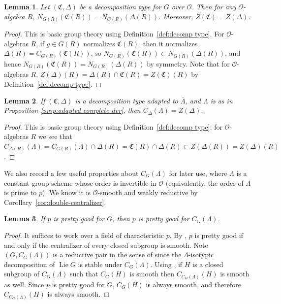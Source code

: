 \documentclass[11pt, letterpaper,english]{amsart}
\theoremstyle{plain}
\newtheorem{lem}{Lemma}
\newtheorem{lemma}[lem]{Lemma}
\theoremstyle{definition}
\numberwithin{equation}{section}
\numberwithin{lem}{section}
\newcommand{\fC}{\mathfrak{C}}
\newcommand{\cO}{\mathcal{O}}
\DeclareMathOperator{\Lie}{Lie}
\newcommand{\cent}[2]{C_{#1}(#2)}
\newcommand{\nlz}[2]{N_{#1}(#2)}
\newcommand{\Ld}{\Lambda}
\newcommand{\Lbar}{\overline{\Lambda}}
\newcommand{\Dt}{\Delta}
\begin{document}
\begin{lem} \label{lem:symmetry}
Let $(\fC, \Dt)$ be a decomposition type for $G$ over $\cO$. Then for any $\cO$-algebra $R$, $\nlz{G(R)}{\fC(R)}=\nlz{G(R)}{\Dt(R)}$.
Moreover, 
$Z(\fC)=Z(\Dt)$.
\end{lem}
\begin{proof}
This is basic group theory using Definition~\ref{def:decomp type}. For $\cO$-algebras $R$, if $g \in G(R)$ normalizes $\fC(R)$, then it normalizes $\Dt(R)=\cent{G(R)}{\fC(R)}$, so $\nlz{G(R)}{\fC(R)} \subset \nlz{G(R)}{\Dt(R)}$, and hence $\nlz{G(R)}{\fC(R)}=\nlz{G(R)}{\Dt(R)}$ by symmetry. Note that for $\cO$-algebras $R$, $Z(\Dt)(R)=\Dt(R) \cap \fC(R)=Z(\fC)(R)$ by Definition~\ref{def:decomp type}. 
\end{proof}

\begin{lemma} \label{lem:adapted}
If $(\fC,\Delta)$ is a decomposition type adapted to $\Lbar$, and $\Ld$ is as in Proposition \ref{prop:adapted complete dvr},
then
$\cent{\Dt}{\Lambda}=Z(\Dt)$. 
\end{lemma}

\begin{proof}
This is basic group theory using Definition~\ref{def:decomp type}: for $\cO$-algebras $R$ we see that $\cent{\Dt(R)}{\Lambda}=\cent{G(R)}{\Lambda} \cap \Dt(R)=\fC(R) \cap \Dt(R) \subset Z(\Dt(R)) = Z(\Dt)(R)$.
\end{proof}

We also record a few useful properties about $C_G(\Lambda)$ for later use, where $\Lambda$ is a constant group scheme whose order is invertible in $\cO$ (equivalently, the order of $\Lambda$ is prime to $p$).  We know it is $\cO$-smooth and weakly reductive by Corollary~\ref{cor:double-centralizer}.


\begin{lemma} \label{lem:cglambda pretty good}
If $p$ is \textit{pretty good} for $G$, then $p$ is \textit{pretty good} for $\cent{G}{\Ld}$.
\end{lemma}

\begin{proof}
It suffices to work over a field of characteristic $p$.  
By \cite[Theorem 3.3]{herpel}, $p$ is pretty good if and only if the centralizer of every closed subgroup is smooth.  Note $(G, C_G(\Lambda))$ is a reductive pair in the sense of \cite[2.7]{herpel} since the $\Ld$-isotypic decomposition of $\Lie G$ is stable under $C_G(\Lambda)$.  Using \cite[Lemma 3.6]{herpel}, if $H$ is a closed subgroup of $C_G(\Lambda)$ such that $C_G(H)$ is smooth then $C_{C_G(\Lambda)}(H)$ is smooth as well. Since $p$ is pretty good for $G$, $C_G(H)$ is always smooth, and therefore $C_{C_G(\Lambda)}(H)$ is always smooth.
\end{proof}
\end{document}
